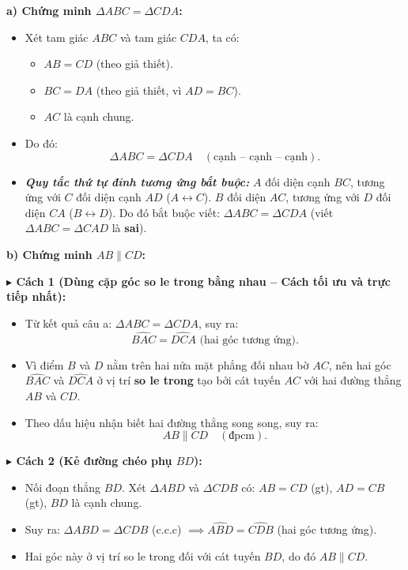 \documentclass[12pt,a4paper]{article}
\begin{document}
\vspace{2mm}
\noindent\textbf{a) Chứng minh $\Delta ABC = \Delta CDA$:}
\begin{itemize}[leftmargin=16pt, itemsep=2pt, parsep=0pt]
  \item Xét tam giác $ABC$ và tam giác $CDA$, ta có:
  \begin{itemize}[leftmargin=14pt, itemsep=1.5pt]
    \item $AB = CD$ (theo giả thiết).
    \item $BC = DA$ (theo giả thiết, vì $AD = BC$).
    \item $AC$ là cạnh chung.
  \end{itemize}
  \item Do đó:
  \[
    \Delta ABC = \Delta CDA \quad (\text{cạnh -- cạnh -- cạnh}).
  \]
  \item \textbf{\textit{Quy tắc thứ tự đỉnh tương ứng bắt buộc:}}
  $A$ đối diện cạnh $BC$, tương ứng với $C$ đối diện cạnh $AD$ ($A \leftrightarrow C$).
  $B$ đối diện $AC$, tương ứng với $D$ đối diện $CA$ ($B \leftrightarrow D$).
  Do đó bắt buộc viết: $\Delta ABC = \Delta CDA$ (viết $\Delta ABC = \Delta CAD$ là \textbf{sai}).
\end{itemize}

\vspace{3mm}
\noindent\textbf{b) Chứng minh $AB \parallel CD$:}

\noindent\textbf{$\blacktriangleright$ Cách 1 (Dùng cặp góc so le trong bằng nhau -- Cách tối ưu và trực tiếp nhất):}
\begin{itemize}[leftmargin=16pt, itemsep=1.5pt, parsep=0pt]
  \item Từ kết quả câu a: $\Delta ABC = \Delta CDA$, suy ra:
  \[
    \widehat{BAC} = \widehat{DCA} \text{ (hai góc tương ứng)}.
  \]
  \item Vì điểm $B$ và $D$ nằm trên hai nửa mặt phẳng đối nhau bờ $AC$, nên hai góc $\widehat{BAC}$ và $\widehat{DCA}$ ở vị trí \textbf{so le trong} tạo bởi cát tuyến $AC$ với hai đường thẳng $AB$ và $CD$.
  \item Theo dấu hiệu nhận biết hai đường thẳng song song, suy ra:
  \[
    AB \parallel CD \quad (\text{đpcm}).
  \]
\end{itemize}

\noindent\textbf{$\blacktriangleright$ Cách 2 (Kẻ đường chéo phụ $BD$):}
\begin{itemize}[leftmargin=16pt, itemsep=1.5pt, parsep=0pt]
  \item Nối đoạn thẳng $BD$. Xét $\Delta ABD$ và $\Delta CDB$ có:
  $AB = CD$ (gt), $AD = CB$ (gt), $BD$ là cạnh chung.
  \item Suy ra: $\Delta ABD = \Delta CDB$ (c.c.c) $\implies \widehat{ABD} = \widehat{CDB}$ (hai góc tương ứng).
  \item Hai góc này ở vị trí so le trong đối với cát tuyến $BD$, do đó $AB \parallel CD$.
\end{itemize}
\end{document}

